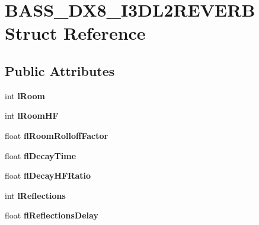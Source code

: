 \hypertarget{structBASS__DX8__I3DL2REVERB}{}\section{B\+A\+S\+S\+\_\+\+D\+X8\+\_\+\+I3\+D\+L2\+R\+E\+V\+E\+R\+B Struct Reference}
\label{structBASS__DX8__I3DL2REVERB}
\subsection*{Public Attributes}
\begin{DoxyCompactItemize}
\item 
\hypertarget{structBASS__DX8__I3DL2REVERB_a520686858323f3210f4c36d6a9cb510c}{}int {\bfseries l\+Room}\label{structBASS__DX8__I3DL2REVERB_a520686858323f3210f4c36d6a9cb510c}

\item 
\hypertarget{structBASS__DX8__I3DL2REVERB_a808a172f5de62ae509adc6fa2c403537}{}int {\bfseries l\+Room\+H\+F}\label{structBASS__DX8__I3DL2REVERB_a808a172f5de62ae509adc6fa2c403537}

\item 
\hypertarget{structBASS__DX8__I3DL2REVERB_ac4e7a936bb33324e4f2845ae4a5d7d4c}{}float {\bfseries fl\+Room\+Rolloff\+Factor}\label{structBASS__DX8__I3DL2REVERB_ac4e7a936bb33324e4f2845ae4a5d7d4c}

\item 
\hypertarget{structBASS__DX8__I3DL2REVERB_a4698afcd5cb82a19422122e048c488a5}{}float {\bfseries fl\+Decay\+Time}\label{structBASS__DX8__I3DL2REVERB_a4698afcd5cb82a19422122e048c488a5}

\item 
\hypertarget{structBASS__DX8__I3DL2REVERB_a86d473034e7f77d712d0f4c9595956c3}{}float {\bfseries fl\+Decay\+H\+F\+Ratio}\label{structBASS__DX8__I3DL2REVERB_a86d473034e7f77d712d0f4c9595956c3}

\item 
\hypertarget{structBASS__DX8__I3DL2REVERB_a218715f13676217b76c0ffaf4f9a1b1b}{}int {\bfseries l\+Reflections}\label{structBASS__DX8__I3DL2REVERB_a218715f13676217b76c0ffaf4f9a1b1b}

\item 
\hypertarget{structBASS__DX8__I3DL2REVERB_a2f14853c94f1c1a9cd2c262ec184f0a5}{}float {\bfseries fl\+Reflections\+Delay}\label{structBASS__DX8__I3DL2REVERB_a2f14853c94f1c1a9cd2c262ec184f0a5}


\end{DoxyCompactItemize}
